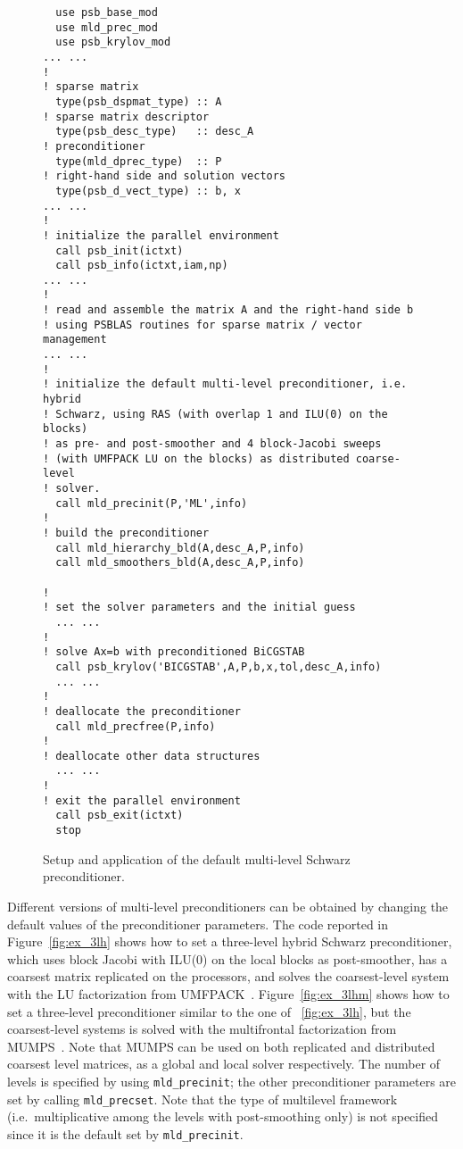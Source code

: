 \begin{figure}[tbp]
\begin{center}
\begin{minipage}{.90\textwidth} 
{\small
\begin{verbatim}
  use psb_base_mod
  use mld_prec_mod
  use psb_krylov_mod
... ...
!
! sparse matrix
  type(psb_dspmat_type) :: A
! sparse matrix descriptor
  type(psb_desc_type)   :: desc_A
! preconditioner
  type(mld_dprec_type)  :: P
! right-hand side and solution vectors
  type(psb_d_vect_type) :: b, x
... ...
!
! initialize the parallel environment
  call psb_init(ictxt)
  call psb_info(ictxt,iam,np)
... ...
!
! read and assemble the matrix A and the right-hand side b 
! using PSBLAS routines for sparse matrix / vector management 
... ...
!
! initialize the default multi-level preconditioner, i.e. hybrid
! Schwarz, using RAS (with overlap 1 and ILU(0) on the blocks) 
! as pre- and post-smoother and 4 block-Jacobi sweeps 
! (with UMFPACK LU on the blocks) as distributed coarse-level 
! solver.
  call mld_precinit(P,'ML',info)
!
! build the preconditioner
  call mld_hierarchy_bld(A,desc_A,P,info)
  call mld_smoothers_bld(A,desc_A,P,info)

!
! set the solver parameters and the initial guess
  ... ...
!
! solve Ax=b with preconditioned BiCGSTAB
  call psb_krylov('BICGSTAB',A,P,b,x,tol,desc_A,info)
  ... ...
!
! deallocate the preconditioner
  call mld_precfree(P,info)
!
! deallocate other data structures
  ... ...
!
! exit the parallel environment
  call psb_exit(ictxt)
  stop
\end{verbatim}
}
\end{minipage}
\caption{Setup and application of the default multi-level Schwarz preconditioner.
\label{fig:ex_default}}
\end{center}
\end{figure}

Different versions of multi-level preconditioners can be obtained by changing
the default values of the preconditioner parameters. The code reported in
Figure~\ref{fig:ex_3lh} shows how to set a three-level hybrid Schwarz
preconditioner, which uses block Jacobi with ILU(0) on the
local blocks as post-smoother, has a coarsest matrix replicated on the processors,
and solves the coarsest-level system with the LU factorization from UMFPACK~\cite{UMFPACK}.
Figure~\ref{fig:ex_3lhm} shows how to set a three-level preconditioner
similar to the one of ~\ref{fig:ex_3lh}, but the coarsest-level
systems is solved with the multifrontal factorization from
MUMPS~\cite{UMFPACK}.  
Note that MUMPS can be used on both replicated and distributed
coarsest level matrices,  as a global and local solver respectively.   
The number of levels is specified by using \verb|mld_precinit|; the other
preconditioner parameters are set by calling \verb|mld_precset|. Note that
the type of multilevel framework (i.e.\ multiplicative among the levels
with post-smoothing only) is not specified since it is the default 
set by \verb|mld_precinit|. 

